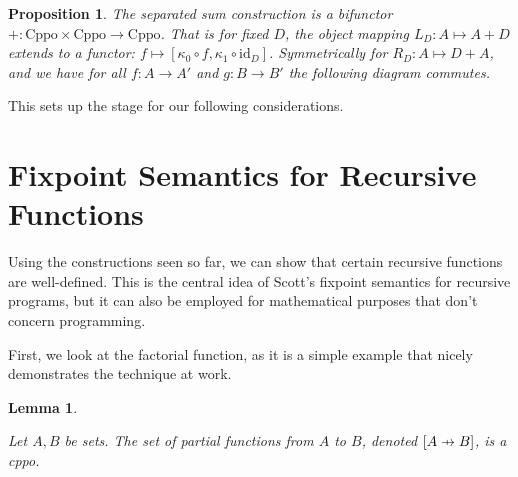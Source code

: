 \documentclass[a4paper]{article}
\newcommand{\arr}{\rightarrow}
\newcommand{\pfun}{\mathrel{\ooalign{\hfil$\mapstochar\mkern5mu$\hfil\cr$\to$\cr}}}
\newcommand{\Cppo}{\text{Cppo}}
\newtheorem{proposition}[definition]{Proposition}
\newtheorem{lemma}[definition]{Lemma}
\begin{document}
\begin{proposition}

The separated sum construction is a bifunctor $+ : \Cppo \times
\Cppo \arr \Cppo$. That is for fixed $D$, the
object mapping $L_D : A \mapsto A + D$ extends to a functor: $f \mapsto
[\kappa_0 \circ f, \kappa_1 \circ \text{id}_D]$.  Symmetrically
for $R_D : A \mapsto D + A$, and we have for all $f
: A \arr A'$ and $g : B \arr B'$ the following diagram commutes.
\begin{center}
\end{center}

\end{proposition}

This sets up the stage for our following considerations.



\section{Fixpoint Semantics for Recursive Functions}
\label{secFixpointSemantics}

Using the constructions seen so far, we can show that certain recursive
functions are well-defined. This is the central idea of Scott's fixpoint
semantics for recursive programs, but it can also be employed for mathematical
purposes that don't concern programming.

First, we look at the factorial function, as it is a simple example that nicely
demonstrates the technique at work.

\begin{lemma} \label{lemPartialFunctionSpaceCppo}

Let $A, B$ be sets. The set of partial functions from $A$ to $B$, denoted
$[A \pfun B]$, is a cppo.

\end{lemma}
\end{document}
